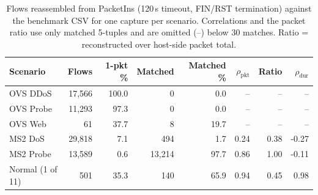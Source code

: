 \begin{table}[t]
\caption{Flows reassembled from PacketIns (120\,s timeout, FIN/RST termination) against the benchmark CSV for one capture per scenario. Correlations and the packet ratio use only matched 5-tuples and are omitted (--) below 30 matches. Ratio = reconstructed over host-side packet total.}
\label{tab:recon}
\centering\footnotesize\setlength{\tabcolsep}{2.0pt}
\begin{tabular}{lrrrrrrr}
\toprule
Scenario & Flows & 1-pkt \% & Matched & Matched \% & $\rho_{\text{pkt}}$ & Ratio & $\rho_{\text{dur}}$ \\
\midrule
OVS DDoS & 17,566 & 100.0 & 0 & 0.0 & -- & -- & -- \\
OVS Probe & 11,293 & 97.3 & 0 & 0.0 & -- & -- & -- \\
OVS Web & 61 & 37.7 & 8 & 19.7 & -- & -- & -- \\
MS2 DoS & 29,818 & 7.1 & 494 & 1.7 & 0.24 & 0.38 & -0.27 \\
MS2 Probe & 13,589 & 0.6 & 13,214 & 97.7 & 0.86 & 1.00 & -0.11 \\
Normal (1 of 11) & 501 & 35.3 & 140 & 65.9 & 0.94 & 0.45 & 0.98 \\
\bottomrule
\end{tabular}
\end{table}
